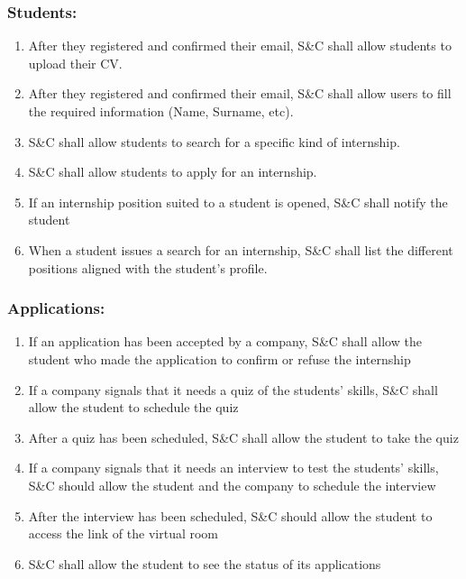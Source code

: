     \subsubsection*{Students:}
        \begin{enumerate}[label=\textbf{R\arabic*},resume]
            \item After they registered and confirmed their email, S\&C shall allow students to upload their CV.   %
            \item After they registered and confirmed their email, S\&C shall allow users to fill the required information (Name, Surname, etc).
            \item S\&C shall allow students to search for a specific kind of internship.    %
            \item S\&C shall allow students to apply for an internship.                     %
            \item If an internship position suited to a student is opened, S\&C shall notify the student
            \item When a student issues a search for an internship, S\&C shall list the different positions aligned with the student's profile.         %
    
            
        \end{enumerate}
    
    \subsubsection*{Applications:}
        \begin{enumerate}[label=\textbf{R\arabic*},resume]
            \item If an application has been accepted by a company, S\&C shall allow the student who made the application to confirm or refuse the internship
            \item If a company signals that it needs a quiz of the students' skills, S\&C shall allow the student to schedule the quiz
            \item After a quiz has been scheduled, S\&C shall allow the student to take the quiz
            \item If a company signals that it needs an interview to test the students' skills, S\&C should allow the student and the company to schedule the interview
            \item After the interview has been scheduled, S\&C should allow the student to access the link of the virtual room
            \item S\&C shall allow the student to see the status of its applications
            
        \end{enumerate}
    
